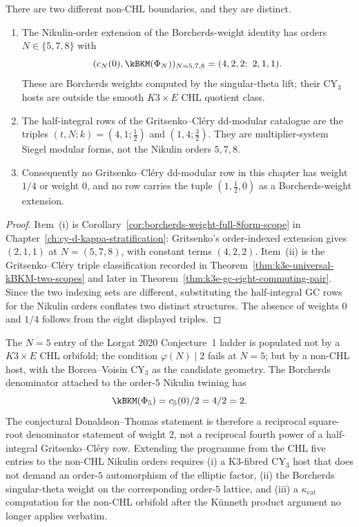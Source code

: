 \begin{proposition}
\label{conj:gc-half-integer}
There are two different non-CHL boundaries, and they are distinct.
\begin{enumerate}[label=\textup{(\roman*)}]
\item The Nikulin-order extension of the Borcherds-weight identity has
orders $N\in\{5,7,8\}$ with
\[
 (c_N(0),\kBKM(\Phi_N))_{N=5,7,8}=(4,2,2;\ 2,1,1).
\]
These are Borcherds weights computed by the singular-theta lift; their CY$_3$ hosts are
outside the smooth $K3\times E$ CHL quotient class.
\item The half-integral rows of the Gritsenko--Cl\'ery dd-modular
catalogue are the triples $(t,N;k)=(4,1;\tfrac12)$ and
$(1,4;\tfrac32)$. They are multiplier-system Siegel modular forms,
not the Nikulin orders $5,7,8$.
\item Consequently no Gritsenko--Cl\'ery dd-modular row in this chapter
has weight $1/4$ or weight $0$, and no row carries the tuple
$(1,\tfrac12,0)$ as a Borcherds-weight extension.
\end{enumerate}
\end{proposition}

\begin{proof}
Item~\textup{(i)} is Corollary~\ref{cor:borcherds-weight-full-8form-scope}
in Chapter~\ref{ch:cy-d-kappa-stratification}: Gritsenko's
order-indexed extension gives $(2,1,1)$ at $N=(5,7,8)$, with
constant terms $(4,2,2)$. Item~\textup{(ii)} is the
Gritsenko--Cl\'ery triple classification recorded in
Theorem~\ref{thm:k3e-universal-kBKM-two-scopes} and later in
Theorem~\ref{thm:k3e-gc-eight-commuting-pair}. Since the two indexing
sets are different, substituting the half-integral GC rows for the
Nikulin orders conflates two distinct structures. The absence of weights $0$ and
$1/4$ follows from the eight displayed triples.
\end{proof}

\begin{conjecture}[Lorgat 2020 Conjecture~1 at non-CHL \texorpdfstring{$N = 5$}{N = 5}: weight-$2$ host]
\label{conj:lorgat-conj1-n5-metaplectic}
The $N = 5$ entry of the Lorgat 2020 Conjecture~1 ladder is populated
not by a $K3 \times E$ CHL orbifold; the condition
$\varphi(N)\mid 2$ fails at $N=5$; but by a non-CHL host, with the
Borcea--Voisin CY$_3$ as the candidate geometry. The Borcherds
denominator attached to the order-$5$ Nikulin twining has
\[
 \kBKM(\Phi_5)=c_5(0)/2=4/2=2.
\]
The conjectural Donaldson--Thomas statement is therefore a reciprocal
square-root denominator statement of weight $2$, not a reciprocal
fourth power of a half-integral Gritsenko--Cl\'ery row. Extending the
programme from the CHL five entries to the non-CHL Nikulin orders
requires (i) a K3-fibred CY$_3$ host that does not demand an order-$5$
automorphism of the elliptic factor, (ii) the Borcherds singular-theta
weight on the corresponding order-$5$ lattice, and (iii) a
$\kappa_{\mathrm{cat}}$ computation for the non-CHL orbifold after the
K\"unneth product argument no longer applies verbatim.
\end{conjecture}

